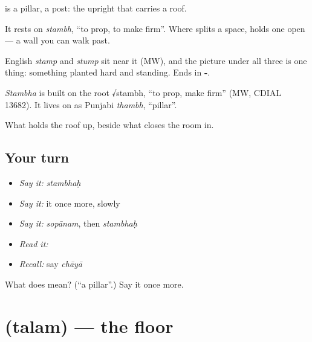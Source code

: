 \textbf{} is a pillar, a post: the upright that carries a roof.

It rests on \emph{stambh}, \textquotedblleft{}to prop, to make firm\textquotedblright{}. Where  splits a space, \textbf{} holds one open — a wall you can walk past.

English \emph{stamp} and \emph{stump} sit near it (MW), and the picture under all three is one thing: something planted hard and standing. Ends in \textbf{-}.

\begin{cousinweb}
\emph{Stambha} is built on the root √stambh, \textquotedblleft{}to prop, make firm\textquotedblright{} (MW, CDIAL 13682). It lives on as Punjabi \emph{thambh}, \textquotedblleft{}pillar\textquotedblright{}.
\end{cousinweb}

\begin{grammarlens}[title={What you've built}]
What holds the roof up, beside what closes the room in.
\end{grammarlens}

\subsection*{Your turn}
\begin{itemize}
\raggedright
  \item \emph{Say it:} \emph{stambhaḥ}
  \item \emph{Say it:} it once more, slowly
  \item \emph{Say it:} \emph{sopānam}, then \emph{stambhaḥ}
  \item \emph{Read it:} \textbf{}
  \item \emph{Recall:} say \emph{chāyā}
\end{itemize}

\begin{tcolorbox}[breakable,colback=teal!4,colframe=teal!35!black,title={Before you move on}]
What does  mean? (\textquotedblleft{}a pillar\textquotedblright{}.) Say it once more.
\end{tcolorbox}
\section[\texorpdfstring{\sk{तलम्} (talam)}{तलम् (talam)}]{ (talam) — the floor}

\label{lesson:SA-C47-floor}



